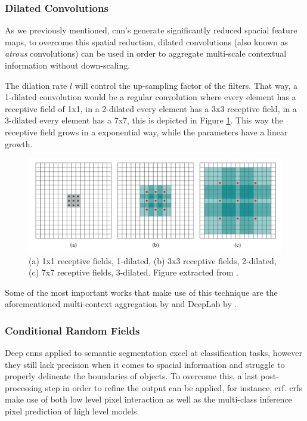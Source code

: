 \subsubsection{Dilated Convolutions}
As we previously mentioned, \gls{cnn}'s generate significantly reduced spacial feature maps, to overcome this spatial reduction, dilated convolutions (also known as \textit{atrous} convolutions) can be used in order to aggregate multi-scale contextual information without down-scaling.

The dilation rate $l$ will control the up-sampling factor of the filters. That way, a 1-dilated convolution would be a regular convolution where every element has a receptive field of 1x1, in a 2-dilated every element has a 3x3 receptive field, in a 3-dilated every element has a 7x7, this is depicted in Figure \ref{fig:dilatedconv}. This way the receptive field grows in a exponential way, while the parameters have a linear growth.

\begin{figure}
	\centering
	\includegraphics[width=0.7\linewidth]{archivos/dilated_conv}
	\caption{(a) 1x1 receptive fields, 1-dilated, (b) 3x3 receptive fields, 2-dilated, (c) 7x7 receptive fields, 3-dilated. Figure extracted from \cite{yu2015multiscale}.}
	\label{fig:dilatedconv}
\end{figure}

Some of the most important works that make use of this technique are the aforementioned multi-context aggregation by \cite{yu2015multiscale} and DeepLab by \cite{DBLP:journals/corr/ChenPK0Y16}.

\subsubsection{Conditional Random Fields}
Deep \gls{cnn}s applied to semantic segmentation excel at classification tasks, however they still lack precision when it comes to spacial information and struggle to properly delineate the boundaries of objects. To overcome this, a last post-processing step in order to refine the output can be applied, for instance, \gls{crf}. \gls{crf}s make use of both low level pixel interaction as well as the multi-class inference pixel prediction of high level models.

